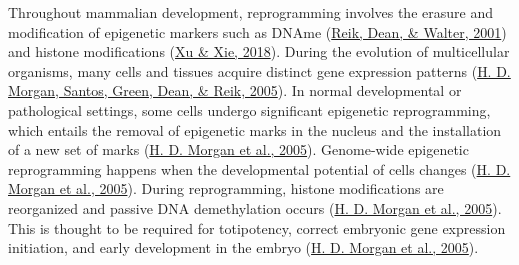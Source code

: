 \documentclass[12pt,twoside]{reedthesis}
\begin{document}
Throughout mammalian development, reprogramming involves the erasure and
modification of epigenetic markers such as DNAme (\protect\hyperlink{ref-reik2001}{Reik, Dean, \& Walter, 2001}) and histone
modifications (\protect\hyperlink{ref-xu2018}{Xu \& Xie, 2018}). During the evolution of multicellular
organisms, many cells and tissues acquire distinct gene expression
patterns (\protect\hyperlink{ref-morgan2005}{H. D. Morgan, Santos, Green, Dean, \& Reik, 2005}). In normal developmental or pathological
settings, some cells undergo significant epigenetic reprogramming, which
entails the removal of epigenetic marks in the nucleus and the
installation of a new set of marks (\protect\hyperlink{ref-morgan2005}{H. D. Morgan et al., 2005}). Genome-wide epigenetic
reprogramming happens when the developmental potential of cells changes
(\protect\hyperlink{ref-morgan2005}{H. D. Morgan et al., 2005}). During reprogramming, histone modifications are
reorganized and passive DNA demethylation occurs (\protect\hyperlink{ref-morgan2005}{H. D. Morgan et al., 2005}). This is
thought to be required for totipotency, correct embryonic gene
expression initiation, and early development in the embryo
(\protect\hyperlink{ref-morgan2005}{H. D. Morgan et al., 2005}).
\end{document}
